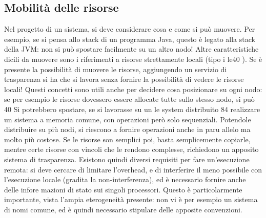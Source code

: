 \subsection{Mobilità delle risorse}
Nel progetto di un sistema, si deve considerare cosa e come si può muovere. Per
esempio, se si pensa allo stack di un programma Java, questo è legato alla stack
della JVM: non si può spostare facilmente su un altro nodo! Altre caratteristiche
dicili da muovere sono i riferimenti a risorse strettamente locali (tipo i le40 ).
Se è presente la possibilità di muovere le risorse, aggiungendo un servizio di
trasparenza si ha che si lavora senza fornire la possibilità di vedere le risorse
locali!
Questi concetti sono utili anche per decidere cosa posizionare su ogni nodo:
se per esempio le risorse dovessero essere allocate tutte sullo stesso nodo, si può
40 Si
potrebbero spostare, se si lavorasse su un le system distribuito
84
realizzare un sistema a memoria comune, con operazioni però solo sequenziali.
Potendole distribuire su più nodi, si riescono a fornire operazioni anche in paru
allelo ma molto più costose. Se le risorse son semplici poi, basta semplicemente
copiarle, mentre certe risorse con vincoli che le rendono complesse, richiedono
un apposito sistema di trasparenza.
Esistono quindi diversi requisiti per fare un'esecuzione remota: si deve cercare di limitare l'overhead, e di
interferire il meno possibile con l'esecuzione
locale (gradita la non-interferenza), ed è necessario fornire anche delle infore
mazioni di stato sui singoli processori. Questo è particolarmente importante,
vista l'ampia eterogeneità presente: non vi è per esempio un sistema di nomi
comune, ed è quindi necessario stipulare delle apposite convenzioni.
